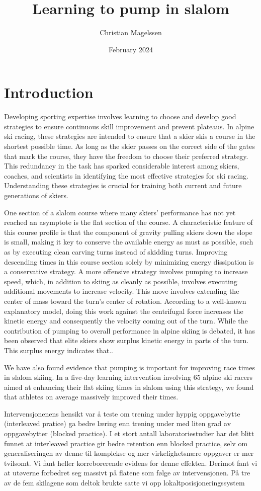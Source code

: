 \documentclass{article}
\title{Learning to pump in slalom}
\author{Christian Magelssen}
\date{February 2024}
\begin{document}
\section{Introduction}

Developing sporting expertise involves learning to choose and develop good strategies to ensure continuous skill improvement and prevent plateaus. In alpine ski racing, these strategies are intended to ensure that a skier skis a course in the shortest possible time. As long as the skier passes on the correct side of the gates that mark the course, they have the freedom to choose their preferred strategy. This redundancy in the task has sparked considerable interest among skiers, coaches, and scientists in identifying the most effective strategies for ski racing. Understanding these strategies is crucial for training both current and future generations of skiers.

One section of a slalom course where many skiers' performance has not yet reached an asymptote is the flat section of the course. A characteristic feature of this course profile is that the component of gravity pulling skiers down the slope is small, making it key to conserve the available energy as must as possible, such as by executing clean carving turns instead of skidding turns. Improving descending times in this course section solely by minimizing energy dissipation is a conservative strategy. A more offensive strategy involves pumping to increase speed, which, in addition to skiing as cleanly as possible, involves executing additional movements to increase velocity. This move involves extending the center of mass toward the turn's center of rotation. According to a well-known explanatory model, doing this work against the centrifugal force increases the kinetic energy and consequently the velocity coming out of the turn. While the contribution of pumping to overall performance in alpine skiing is debated, it has been observed that elite skiers show surplus kinetic energy in parts of the turn. This surplus energy indicates that..

We have also found evidence that pumping is important for improving race times in slalom skiing. In a five-day learning intervention involving 65 alpine ski racers aimed at enhancing their flat skiing times in slalom using this strategy, we found that athletes on average massively improved their times.


Intervensjonenens hensikt var å teste om trening under hyppig oppgavebytte (interleaved pratice) ga bedre læring enn trening under med liten grad av oppgavebytter (blocked practice). I et stort antall laboratoriestudier har det blitt funnet at interleaved practice gir bedre retention enn blocked practice, selv om generaliseringen av denne til komplekse og mer virkelighetsnære oppgaver er mer tvilsomt. Vi fant heller korreborerende evidens for denne effekten. Derimot fant vi at utøverne forbedret seg massivt på flatene som følge av intervensjonen. På tre av de fem skilagene som deltok brukte satte vi opp lokaltposisjoneringssystem
\end{document}
